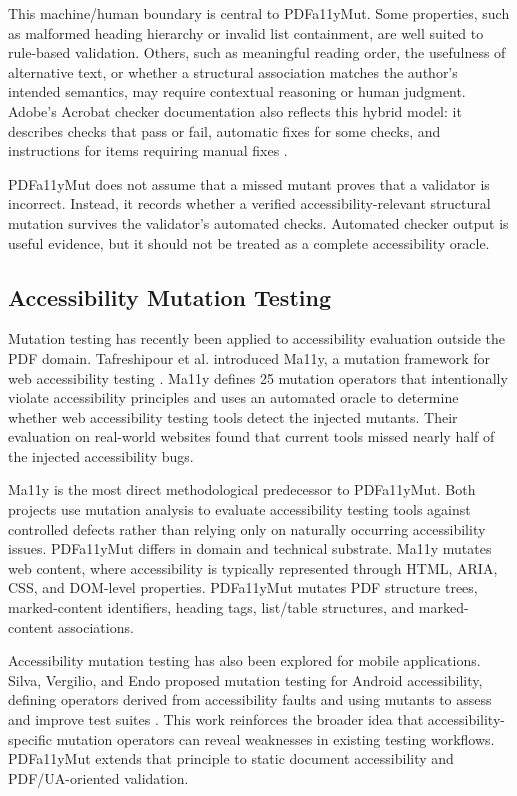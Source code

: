 \documentclass[conference]{IEEEtran}
\begin{document}
This machine/human boundary is central to PDFa11yMut. Some properties, such as malformed heading hierarchy or invalid list containment, are well suited to rule-based validation. Others, such as meaningful reading order, the usefulness of alternative text, or whether a structural association matches the author's intended semantics, may require contextual reasoning or human judgment. Adobe's Acrobat checker documentation also reflects this hybrid model: it describes checks that pass or fail, automatic fixes for some checks, and instructions for items requiring manual fixes \cite{adobeaccessibility}.

PDFa11yMut does not assume that a missed mutant proves that a validator is incorrect. Instead, it records whether a verified accessibility-relevant structural mutation survives the validator's automated checks. Automated checker output is useful evidence, but it should not be treated as a complete accessibility oracle.

\subsection{Accessibility Mutation Testing}

Mutation testing has recently been applied to accessibility evaluation outside the PDF domain. Tafreshipour et al. introduced Ma11y, a mutation framework for web accessibility testing \cite{tafreshipour2024ma11y}. Ma11y defines 25 mutation operators that intentionally violate accessibility principles and uses an automated oracle to determine whether web accessibility testing tools detect the injected mutants. Their evaluation on real-world websites found that current tools missed nearly half of the injected accessibility bugs.

Ma11y is the most direct methodological predecessor to PDFa11yMut. Both projects use mutation analysis to evaluate accessibility testing tools against controlled defects rather than relying only on naturally occurring accessibility issues. PDFa11yMut differs in domain and technical substrate. Ma11y mutates web content, where accessibility is typically represented through HTML, ARIA, CSS, and DOM-level properties. PDFa11yMut mutates PDF structure trees, marked-content identifiers, heading tags, list/table structures, and marked-content associations.

Accessibility mutation testing has also been explored for mobile applications. Silva, Vergilio, and Endo proposed mutation testing for Android accessibility, defining operators derived from accessibility faults and using mutants to assess and improve test suites \cite{silva2022android}. This work reinforces the broader idea that accessibility-specific mutation operators can reveal weaknesses in existing testing workflows. PDFa11yMut extends that principle to static document accessibility and PDF/UA-oriented validation.
\end{document}
